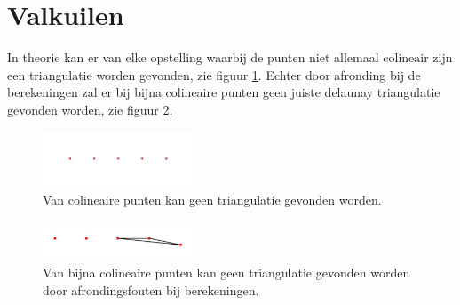 \section{Valkuilen}
In theorie kan er van elke opstelling waarbij de punten niet allemaal colineair zijn een triangulatie worden gevonden, zie figuur \ref{colineair}. Echter door afronding bij de berekeningen zal er bij bijna colineaire punten geen juiste delaunay triangulatie gevonden worden, zie figuur \ref{almost_colineair}. 

\begin{figure}
	\center
	\includegraphics[width=0.4\textwidth]{colineair}
	\caption{Van colineaire punten kan geen triangulatie gevonden worden.}
	\label{colineair}
\end{figure}
\begin{figure}
	\center
	\includegraphics[width=0.4\textwidth]{almost_colinair}
	\caption{Van bijna colineaire punten kan geen triangulatie gevonden worden door afrondingsfouten bij berekeningen.}
	\label{almost_colineair}
\end{figure}
